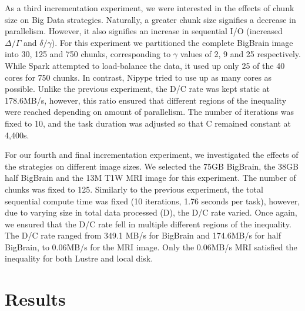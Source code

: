 As a third incrementation experiment, we were interested in the effects of 
chunk size on Big Data strategies. Naturally, a greater chunk size signifies 
a decrease in parallelism. However, it also signifies an increase in 
sequential I/O (increased $\Delta/\Gamma$ and $\delta/\gamma$). For 
this experiment we partitioned the complete BigBrain image into 30, 125 
and 750 chunks, corresponding to $\gamma$ values of 2, 9 and 25 
respectively. While Spark attempted to load-balance the data, it used 
up only 25 of the 40 cores for 750 chunks. In contrast, Nipype tried to 
use up as many cores as possible. Unlike the previous 
experiment, the D/C rate was kept static at 178.6MB/s, however, this 
ratio ensured that different regions of the inequality were reached 
depending on amount of parallelism. The number of iterations was
fixed to 10, and the task duration was adjusted so that C remained constant at 4,400s.

For our fourth and final incrementation experiment, we investigated the effects 
of the strategies on different image sizes. We selected the 75GB BigBrain, the
38GB half BigBrain and the 13M T1W MRI image for this experiment. The number of
chunks was fixed to 125. Similarly to the previous experiment, the 
total sequential compute time was fixed (10 iterations, 1.76 seconds 
per task), however, due to varying size in total data processed (D), 
the D/C rate varied. Once again, we ensured that the D/C rate fell in 
multiple different regions of the inequality. The D/C rate ranged from 
349.1 MB/s for BigBrain and 174.6MB/s for half BigBrain, to 0.06MB/s for the MRI 
image. Only the 0.06MB/s MRI satisfied the inequality for both Lustre and local 
disk.









\section{Results} %
\label{sec:results}


